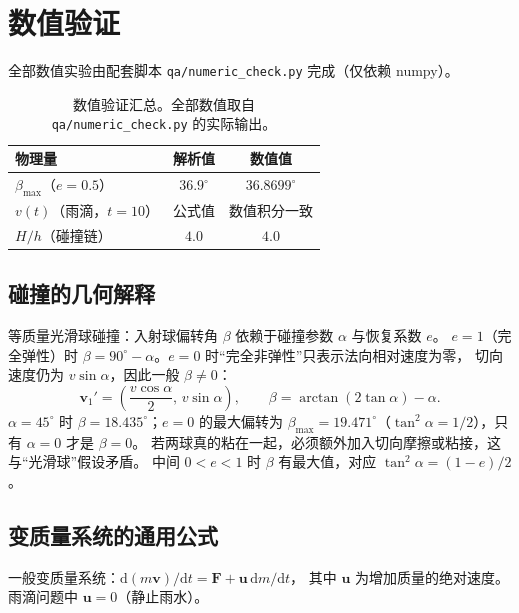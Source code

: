 \documentclass[UTF8,a4paper,11pt]{ctexart}
\begin{document}
\section{数值验证}
\label{sec:numeric}

全部数值实验由配套脚本 \texttt{qa/numeric\_check.py} 完成（仅依赖 numpy）。

\begin{table}[htbp]
\centering
\small
\begin{tabular}{p{5cm}cc}
\toprule
物理量 & 解析值 & 数值值 \\
\midrule
$\beta_{\max}$（$e=0.5$） & $36.9^\circ$ & $36.8699^\circ$ \\
$v(t)$（雨滴，$t=10$） & 公式值 & 数值积分一致 \\
$H/h$（碰撞链） & $4.0$ & $4.0$ \\
\bottomrule
\end{tabular}
\caption{数值验证汇总。全部数值取自 \texttt{qa/numeric\_check.py} 的实际输出。}
\label{tab:numeric}
\end{table}

\subsection{碰撞的几何解释}
\label{sub:collision-geometry}

等质量光滑球碰撞：入射球偏转角 $\beta$ 依赖于碰撞参数 $\alpha$ 与恢复系数 $e$。
$e=1$（完全弹性）时 $\beta=90^\circ-\alpha$。$e=0$ 时“完全非弹性”只表示法向相对速度为零，
切向速度仍为 $v\sin\alpha$，因此一般 $\beta\ne0$：
\begin{equation}
  \boldsymbol v_1'=\left(\frac{v\cos\alpha}{2},\,v\sin\alpha\right),
  \qquad
  \beta=\arctan\!\left(2\tan\alpha\right)-\alpha.
\end{equation}
$\alpha=45^\circ$ 时 $\beta=18.435^\circ$；$e=0$ 的最大偏转为
$\beta_{\max}=19.471^\circ$（$\tan^2\alpha=1/2$），只有 $\alpha=0$ 才是 $\beta=0$。
若两球真的粘在一起，必须额外加入切向摩擦或粘接，这与“光滑球”假设矛盾。
中间 $0<e<1$ 时 $\beta$ 有最大值，对应 $\tan^2\alpha=(1-e)/2$。

\subsection{变质量系统的通用公式}
\label{sub:variable-mass-general}

一般变质量系统：$\mathrm d(m\boldsymbol v)/\mathrm dt=\boldsymbol F+\boldsymbol u\,\mathrm dm/\mathrm dt$，
其中 $\boldsymbol u$ 为增加质量的绝对速度。雨滴问题中 $\boldsymbol u=0$（静止雨水）。
\end{document}
